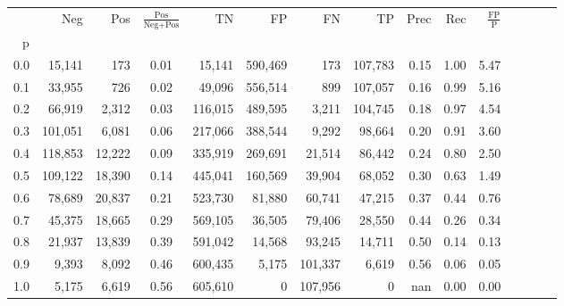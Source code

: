 \begin{tabular}{rrrcrrrrrrrrrrr}
\toprule
{} &      Neg &     Pos & $\frac{\text{Pos}}{\text{Neg}+\text{Pos}}$ &       TN &       FP &       FN &       TP &  Prec &   Rec & $\frac{\text{FP}}{\text{P}}$ \\
p   &          &         &                                            &          &          &          &          &       &       &                              \\
\midrule
0.0 &   15,141 &     173 &                                       0.01 &   15,141 &  590,469 &      173 &  107,783 &  0.15 &  1.00 &                         5.47 \\
0.1 &   33,955 &     726 &                                       0.02 &   49,096 &  556,514 &      899 &  107,057 &  0.16 &  0.99 &                         5.16 \\
0.2 &   66,919 &   2,312 &                                       0.03 &  116,015 &  489,595 &    3,211 &  104,745 &  0.18 &  0.97 &                         4.54 \\
0.3 &  101,051 &   6,081 &                                       0.06 &  217,066 &  388,544 &    9,292 &   98,664 &  0.20 &  0.91 &                         3.60 \\
0.4 &  118,853 &  12,222 &                                       0.09 &  335,919 &  269,691 &   21,514 &   86,442 &  0.24 &  0.80 &                         2.50 \\
0.5 &  109,122 &  18,390 &                                       0.14 &  445,041 &  160,569 &   39,904 &   68,052 &  0.30 &  0.63 &                         1.49 \\
0.6 &   78,689 &  20,837 &                                       0.21 &  523,730 &   81,880 &   60,741 &   47,215 &  0.37 &  0.44 &                         0.76 \\
0.7 &   45,375 &  18,665 &                                       0.29 &  569,105 &   36,505 &   79,406 &   28,550 &  0.44 &  0.26 &                         0.34 \\
0.8 &   21,937 &  13,839 &                                       0.39 &  591,042 &   14,568 &   93,245 &   14,711 &  0.50 &  0.14 &                         0.13 \\
0.9 &    9,393 &   8,092 &                                       0.46 &  600,435 &    5,175 &  101,337 &    6,619 &  0.56 &  0.06 &                         0.05 \\
1.0 &    5,175 &   6,619 &                                       0.56 &  605,610 &        0 &  107,956 &        0 &   nan &  0.00 &                         0.00 \\
\bottomrule
\end{tabular}
